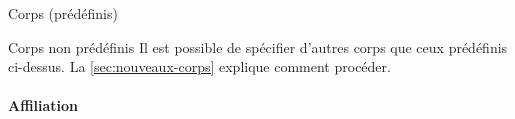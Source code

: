 %
\begin{dbexample}{Corps (prédéfinis)}{}
\begin{bodycode}
%
%
\end{bodycode}
\end{dbexample}
%
\begin{dbremark}{Corps non prédéfinis}{}
  Il est possible de spécifier d'autres corps que ceux prédéfinis ci-dessus. La
  \vref{sec:nouveaux-corps} explique comment procéder.
\end{dbremark}
%

\paragraph{Affiliation}
\label{sec:inst-de-prov}

